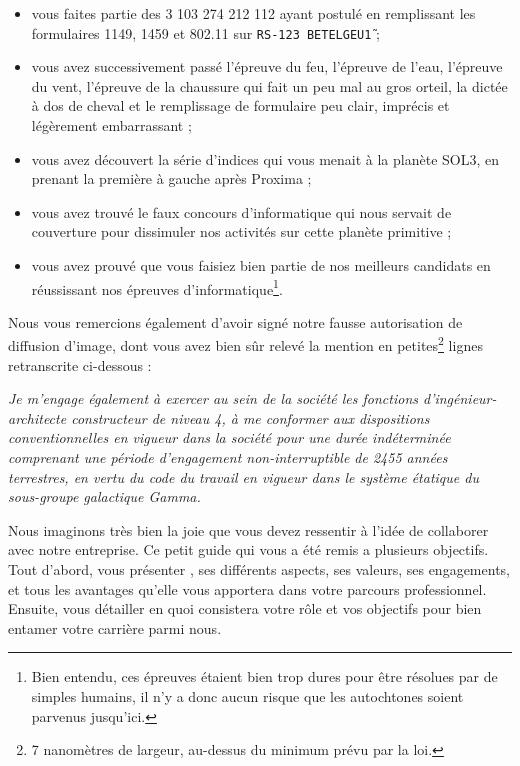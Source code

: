 \begin{itemize}
    \item vous faites partie des 3 103 274 212 112 ayant postulé en remplissant
        les formulaires 1149, 1459 et 802.11 sur \texttt{RS-123 BETELGEU\~1} ;
    \item vous avez successivement passé l'épreuve du feu, l'épreuve de l'eau,
        l'épreuve du vent, l'épreuve de la chaussure qui fait un peu mal au
        gros orteil, la dictée à dos de cheval et le remplissage de formulaire
        peu clair, imprécis et légèrement embarrassant ;
    \item vous avez découvert la série d'indices qui vous menait à la planète
        SOL3, en prenant la première à gauche après Proxima ;
    \item vous avez trouvé le faux concours d'informatique qui nous servait de
        couverture pour dissimuler nos activités sur cette planète primitive ;
    \item vous avez prouvé que vous faisiez bien partie de nos meilleurs
        candidats en réussissant nos épreuves d'informatique\footnote{Bien
        entendu, ces épreuves étaient bien trop dures pour être résolues par de
        simples humains, il n'y a donc aucun risque que les autochtones soient
        parvenus jusqu'ici.}.
\end{itemize}

Nous vous remercions également d'avoir signé notre fausse autorisation de
diffusion d'image, dont vous avez bien sûr relevé la mention en
petites\footnote{7 nanomètres de largeur, au-dessus du minimum prévu par la
loi.} lignes retranscrite ci-dessous :

\emph{Je m'engage également à exercer au sein de la société \provogon{} les
fonctions d'ingénieur-architecte constructeur de niveau 4, à me conformer aux
dispositions conventionnelles en vigueur dans la société \provogon{} pour une
durée indéterminée comprenant une période d'engagement non-interruptible de
2455 années terrestres, en vertu du code du travail en vigueur dans le système
étatique du sous-groupe galactique Gamma.}

Nous imaginons très bien la joie que vous devez ressentir à l'idée de
collaborer avec notre entreprise. Ce petit guide qui vous a été remis a
plusieurs objectifs. Tout d'abord, vous présenter \provogon{}, ses différents
aspects, ses valeurs, ses engagements, et tous les avantages qu'elle vous
apportera dans votre parcours professionnel. Ensuite, vous détailler en quoi
consistera votre rôle et vos objectifs pour bien entamer votre carrière parmi
nous.

